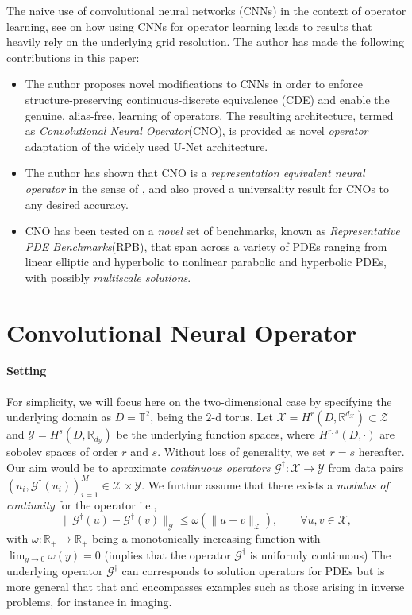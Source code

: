 \documentclass[reqno,9pt]{amsart}
\theoremstyle{plain}
\theoremstyle{definition}
\newcommand{\bb}[1]{\mathbb{#1}}
\newcommand{\cal}[1]{\mathcal{#1}}
\begin{document}
    \noindent The naive use of convolutional neural networks (CNNs) in the context of operator learning, see \cite{FB2023,Zhu2018,ZL2021} on how using CNNs for operator learning leads to results that heavily rely on the underlying grid resolution. The author has made the following contributions in this paper:
    \begin{itemize}
        \item The author proposes novel modifications to CNNs in order to enforce structure-preserving continuous-discrete equivalence (CDE) and enable the genuine, alias-free, learning of operators. The  resulting architecture, termed as {\it Convolutional Neural Operator}(CNO), is provided as novel {\it operator} adaptation of the widely used U-Net architecture.
        \item The author has shown that CNO is a {\it representation equivalent neural operator} in the sense of \cite{FB2023}, and also proved a universality result for CNOs to any desired accuracy.
        \item CNO has been tested on a {\it novel} set of benchmarks, known as {\it Representative PDE Benchmarks}(RPB), that span across a variety of PDEs ranging from linear elliptic and hyperbolic to nonlinear parabolic and hyperbolic PDEs, with possibly {\it multiscale solutions}. 
    \end{itemize}

    \section{Convolutional Neural Operator}
    \paragraph{\bf Setting} For simplicity, we will focus here on the two-dimensional case by specifying the underlying domain as $D = \bb T^2$, being the $2$-d torus. Let $\cal X = H^r(D,\bb R^{d_{\cal X}}) \subset \cal Z$ and $\cal Y = H^s(D,\bb R_{d_\cal Y})$ be the underlying function spaces, where $H^{r,s}(D,\cdot)$ are sobolev spaces of order $r$ and $s$. Without loss of generality, we set $r = s$ hereafter. Our aim would be to aproximate {\it continuous operators} $\cal G^\dag : \cal X \to \cal Y$ from data pairs $(u_i, \cal G^\dag(u_i))_{i=1}^M \in \cal X \times \cal Y$. We furthur assume that there exists a {\it modulus of continuity} for the operator i.e.,
    \begin{equation}
        \|\cal G^\dag(u) - \cal G^\dag(v)\|_{\cal Y} \leq \omega(\|u - v\|_{\cal Z}), \qquad \forall u,v \in \cal X,
    \end{equation}
    with $\omega : \bb R_+ \to \bb R_+$ being a monotonically increasing function with $\lim_{y\to 0}\omega(y) = 0$ (implies that the operator $\cal G^\dag$ is uniformly continuous) The underlying operator $\cal G^\dag$ can corresponds to solution operators for PDEs but is more general that that and encompasses examples such as those arising in inverse problems, for instance in imaging.
\end{document}
